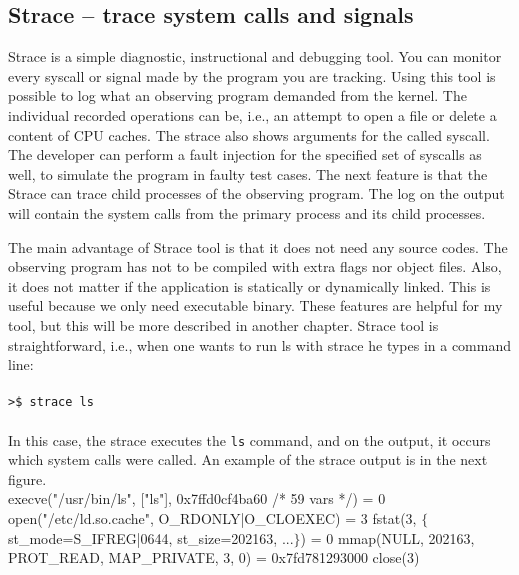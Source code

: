 \subsection{Strace -- trace system calls and signals}

Strace\cite{strace_man} is a simple diagnostic, instructional and debugging tool.
You can monitor every syscall or signal made by the program you are tracking.
Using this tool is possible to log what an observing program demanded from the kernel.
The individual recorded operations can be, i.e., an attempt to open a file or delete a content of CPU caches.
The strace also shows arguments for the called syscall.
The developer can perform a fault injection for the specified set of syscalls as well, to simulate the program in faulty test cases.
The next feature is that the Strace can trace child processes of the observing program.
The log on the output will contain the system calls from the primary process and its child processes.

The main advantage of Strace tool is that it does not need any source codes.
The observing program has not to be compiled with extra flags nor object files.
Also, it does not matter if the application is statically or dynamically linked.
This is useful because we only need executable binary.
These features are helpful for my tool, but this will be more described in another chapter.
Strace tool is straightforward, i.e., when one wants to run ls with strace he types in a command line:\\
\\
\texttt{>\$ strace ls}\\
\\
In this case, the strace executes the \texttt{ls} command, and on the output, it occurs which system calls were called.
An example of the strace output is in the next figure.\\[2mm]

\selectfont\noindent
execve("/usr/bin/ls", ["ls"], 0x7ffd0cf4ba60 /* 59 vars */) = 0\linebreak
open("/etc/ld.so.cache", O\_RDONLY|O\_CLOEXEC) = 3\linebreak
fstat(3, $\{$ st\_mode=S\_IFREG|0644, st\_size=202163, ...$\}$) = 0\linebreak
mmap(NULL, 202163, PROT\_READ, MAP\_PRIVATE, 3, 0) = 0x7fd781293000\linebreak
close(3)\linebreak
\fontfamily{\familydefault}\selectfont

